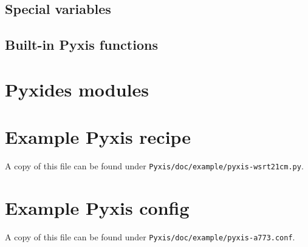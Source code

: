 \documentclass[a4paper,10pt]{article}
\begin{document}
\subsection{Special variables}

\subsection{Built-in Pyxis functions}


\section{Pyxides modules}


\appendix\newpage

\section{Example Pyxis recipe}
\label{app:recipe}

A copy of this file can be found under {\tt Pyxis/doc/example/pyxis-wsrt21cm.py}.

{\scriptsize

}
\section{Example Pyxis config}
\label{app:config}

A copy of this file can be found under {\tt Pyxis/doc/example/pyxis-a773.conf}.

{\scriptsize

}
\end{document}
